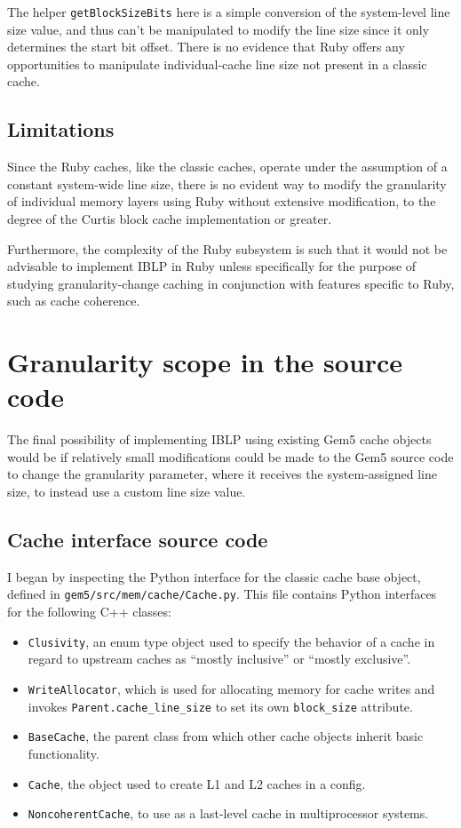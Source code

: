 \documentclass[12pt,twoside]{reedthesis}
\begin{document}
	The helper \verb`getBlockSizeBits` here is a simple conversion of the system-level line size value, and thus can't be manipulated to modify the line size since it only determines the start bit offset. There is no evidence that Ruby offers any opportunities to manipulate individual-cache line size not present in a classic cache.

	\subsection*{Limitations}

	Since the Ruby caches, like the classic caches, operate under the assumption of a constant system-wide line size, there is no evident way to modify the granularity of individual memory layers using Ruby without extensive modification, to the degree of the Curtis block cache implementation or greater.

	Furthermore, the complexity of the Ruby subsystem is such that it would not be advisable to implement IBLP in Ruby unless specifically for the purpose of studying granularity-change caching in conjunction with features specific to Ruby, such as cache coherence.

\section{Granularity scope in the source code}

	The final possibility of implementing IBLP using existing Gem5 cache objects would be if relatively small modifications could be made to the Gem5 source code to change the granularity parameter, where it receives the system-assigned line size, to instead use a custom line size value.

	\subsection*{Cache interface source code}

	I began by inspecting the Python interface for the classic cache base object, defined in \verb`gem5/src/mem/cache/Cache.py`. This file contains Python interfaces for the following C++ classes:
	\begin{itemize}
		\item \verb`Clusivity`, an enum type object used to specify the behavior of a cache in regard to upstream caches as ``mostly inclusive'' or ``mostly exclusive''.
		\item \verb`WriteAllocator`, which is used for allocating memory for cache writes and invokes \verb`Parent.cache_line_size` to set its own \verb`block_size` attribute.
		\item \verb`BaseCache`, the parent class from which other cache objects inherit basic functionality.
		\item \verb`Cache`, the object used to create L1 and L2 caches in a config.
		\item \verb`NoncoherentCache`, to use as a last-level cache in multiprocessor systems.
	\end{itemize}
\end{document}
